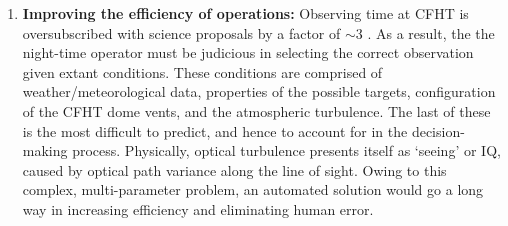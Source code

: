    

\iffalse


\begin{enumerate}
    \item \textbf{Improving the efficiency of operations:} Observing time at CFHT is oversubscribed with science proposals by a factor of $\sim 3$ . As a result, the the night-time operator  must be judicious in selecting the correct observation given extant conditions. These conditions are comprised of weather/meteorological data, properties of the possible targets, configuration of the CFHT dome vents, and the atmospheric turbulence. The last of these is the most difficult to predict, and hence to account for in the decision-making process. Physically, optical turbulence presents itself as `seeing' or IQ, caused by optical path variance along the line of sight. %
    Owing to this complex, multi-parameter problem, an automated solution would go a long way in increasing efficiency and eliminating human error.

\end{enumerate}

